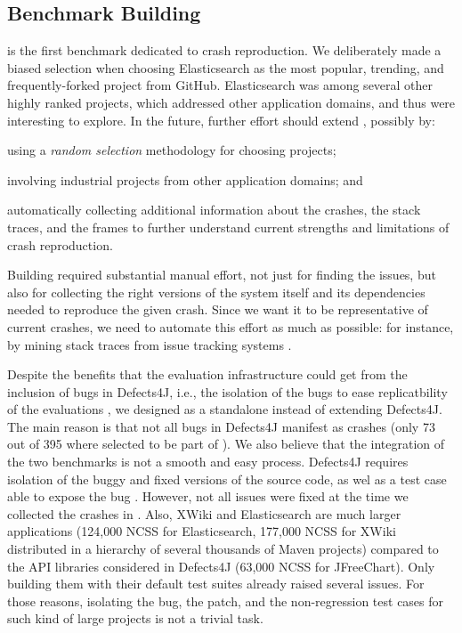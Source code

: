 \subsection{Benchmark Building}

\crashpack is the first benchmark dedicated to crash reproduction.
We deliberately made a biased selection when choosing Elasticsearch as the most popular, trending, and frequently-forked project from GitHub.
Elasticsearch was among several other highly ranked projects, which addressed other application domains, and thus were interesting to explore.
In the future, further effort should extend \crashpack, possibly by:
\begin{inparaenum}[(i)]
\item using a \textit{random selection} methodology for choosing projects; 
\item involving industrial projects from other application domains;
and \item automatically collecting additional information about the crashes, the stack traces, and the frames to further understand current strengths and limitations of crash reproduction.
\end{inparaenum}

Building \crashpack required substantial manual effort, not just for finding the issues, but also for collecting the right versions of the system itself and its dependencies needed  to reproduce the given crash.
Since we want it to be representative of current crashes, we need to automate this effort as much as possible: for instance, by mining stack traces from issue tracking systems \cite{Nayrolles2016}.

Despite the benefits that the evaluation infrastructure could get from the inclusion of \crashpack bugs in Defects4J, i.e., the isolation of the bugs to ease replicatbility of the evaluations \cite{just2014defects4j}, we designed \crashpack as a standalone instead of extending Defects4J.
The main reason is that not all bugs in Defects4J manifest as crashes (only 73 out of 395 where selected to be part of \crashpack). 
We also believe that the integration of the two benchmarks is not a smooth and easy process.
Defects4J requires isolation of the buggy and fixed versions of the source code, as wel as a test case able to expose the bug \cite{just2014defects4j}. However, not all issues were fixed at the time we collected the crashes in \crashpack.
Also, XWiki and Elasticsearch are much larger applications (124,000 NCSS for Elasticsearch, 177,000 NCSS for XWiki distributed in a hierarchy of several thousands of Maven projects) compared to the API libraries considered in Defects4J (63,000 NCSS for JFreeChart). 
Only building them with their default test suites already raised several issues. 
For those reasons, isolating the bug, the patch, and the non-regression test cases for such kind of large projects is not a trivial task. 








